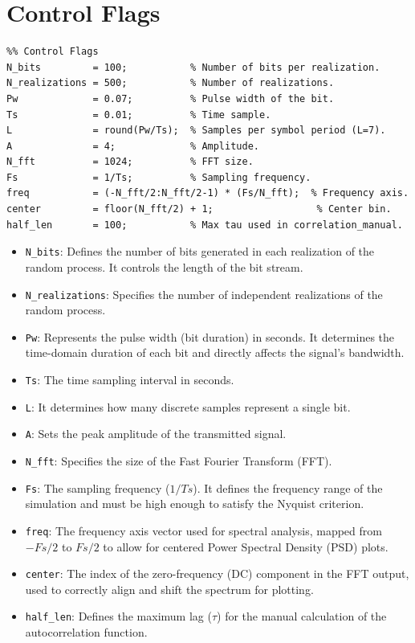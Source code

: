 \chapter[Control Flags]{Control Flags}
\label{cp:control-flags}


\begin{listing}[!htpb]
    \caption{Defining the control flags.}
    \label{listing:control-flags}
    \begin{verbatim}
%% Control Flags
N_bits         = 100;           % Number of bits per realization.
N_realizations = 500;           % Number of realizations.
Pw             = 0.07;          % Pulse width of the bit.
Ts             = 0.01;          % Time sample.
L              = round(Pw/Ts);  % Samples per symbol period (L=7).
A              = 4;             % Amplitude.
N_fft          = 1024;          % FFT size.
Fs             = 1/Ts;          % Sampling frequency.
freq           = (-N_fft/2:N_fft/2-1) * (Fs/N_fft);  % Frequency axis.
center         = floor(N_fft/2) + 1;                  % Center bin.
half_len       = 100;           % Max tau used in correlation_manual.
\end{verbatim}
\end{listing}


\begin{itemize}
    \item \texttt{N\_bits}: Defines the number of bits generated in each realization of the random process. It controls the length of the bit stream.
    \item \texttt{N\_realizations}: Specifies the number of independent realizations of the random process.
    \item \texttt{Pw}: Represents the pulse width (bit duration) in seconds. It determines the time-domain duration of each bit and directly affects the signal's bandwidth.
    \item \texttt{Ts}: The time sampling interval in seconds.
    \item \texttt{L}: It determines how many discrete samples represent a single bit.
    \item \texttt{A}: Sets the peak amplitude of the transmitted signal.
    \item \texttt{N\_fft}: Specifies the size of the Fast Fourier Transform (FFT).
    \item \texttt{Fs}: The sampling frequency ($1/Ts$). It defines the frequency range of the simulation and must be high enough to satisfy the Nyquist criterion.
    \item \texttt{freq}: The frequency axis vector used for spectral analysis, mapped from $-Fs/2$ to $Fs/2$ to allow for centered Power Spectral Density (PSD) plots.
    \item \texttt{center}: The index of the zero-frequency (DC) component in the FFT output, used to correctly align and shift the spectrum for plotting.
    \item \texttt{half\_len}: Defines the maximum lag ($\tau$) for the manual calculation of the autocorrelation function.
\end{itemize}